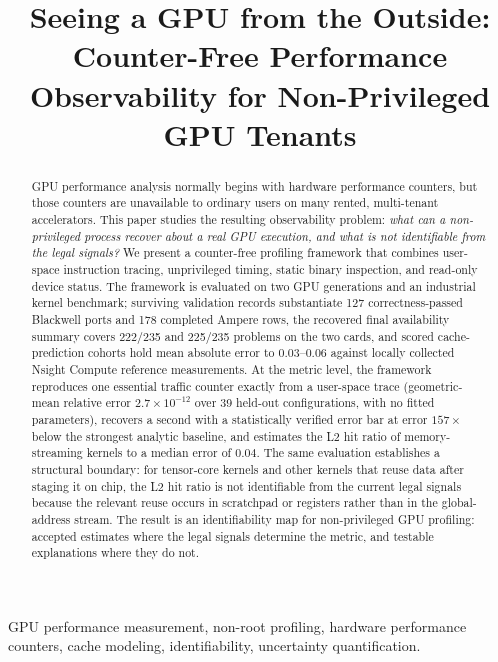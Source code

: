 \documentclass[conference]{IEEEtran}
\begin{document}
\title{Seeing a GPU from the Outside:\\
Counter-Free Performance Observability for Non-Privileged GPU Tenants}

\author{}

\maketitle

\begin{abstract}
GPU performance analysis normally begins with hardware performance counters,
but those counters are unavailable to ordinary users on many rented,
multi-tenant accelerators. This paper studies the resulting observability
problem: \emph{what can a non-privileged process recover about a real GPU
execution, and what is not identifiable from the legal signals?}
We present a counter-free profiling framework that combines user-space
instruction tracing, unprivileged timing, static binary inspection, and
read-only device status. The framework is evaluated on two GPU generations
and an industrial kernel benchmark; surviving validation records substantiate
127 correctness-passed Blackwell ports and 178 completed Ampere rows, the
recovered final availability summary covers 222/235 and 225/235 problems on
the two cards, and scored cache-prediction cohorts hold mean absolute error
to $0.03$--$0.06$ against locally collected Nsight Compute reference
measurements. At the
metric level, the framework reproduces one essential traffic counter exactly
from a user-space trace (geometric-mean relative error
$2.7\times10^{-12}$ over 39 held-out configurations, with no fitted
parameters), recovers a second with a statistically verified error bar at
error $157\times$ below the strongest analytic baseline, and estimates the
L2 hit ratio of memory-streaming kernels to a median error of $0.04$. The
same evaluation establishes a structural boundary: for tensor-core kernels
and other kernels that reuse data after staging it on chip, the L2 hit ratio
is not identifiable from the current legal signals because the relevant reuse
occurs in scratchpad or registers rather than in the global-address stream.
The result is an identifiability map for non-privileged GPU profiling:
accepted estimates where the legal signals determine the metric, and
testable explanations where they do not.
\end{abstract}

\begin{IEEEkeywords}
GPU performance measurement, non-root profiling, hardware performance counters,
cache modeling, identifiability, uncertainty quantification.
\end{IEEEkeywords}
\end{document}
